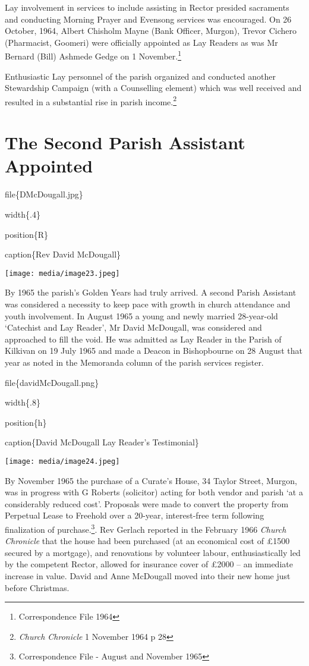 Lay involvement in services to include assisting in Rector presided
sacraments and conducting Morning Prayer and Evensong services was
encouraged. On 26 October, 1964, Albert Chisholm Mayne (Bank Officer,
Murgon), Trevor Cichero (Pharmacist, Goomeri) were officially appointed
as Lay Readers as was Mr Bernard (Bill) Ashmede Gedge on 1
November.\footnote{Correspondence File 1964}

Enthusiastic Lay personnel of the parish organized and conducted another
Stewardship Campaign (with a Counselling element) which was well
received and resulted in a substantial rise in parish income.\footnote{\emph{Church
  Chronicle} 1 November 1964 p 28}

\hypertarget{the-second-parish-assistant-appointed}{%
\section{The Second Parish Assistant
Appointed}\label{the-second-parish-assistant-appointed}}

file\{DMcDougall.jpg\}

width\{.4\}

position\{R\}

caption\{Rev David McDougall\}

\texttt{[image: media/image23.jpeg]}

By 1965 the parish's Golden Years had truly arrived. A second Parish
Assistant was considered a necessity to keep pace with growth in church
attendance and youth involvement. In August 1965 a young and newly
married 28-year-old `Catechist and Lay Reader', Mr David McDougall, was
considered and approached to fill the void. He was admitted as Lay
Reader in the Parish of Kilkivan on 19 July 1965 and made a Deacon in
Bishopbourne on 28 August that year as noted in the Memoranda column of
the parish services register.

file\{davidMcDougall.png\}

width\{.8\}

position\{h\}

caption\{David McDougall Lay Reader's Testimonial\}

\texttt{[image: media/image24.jpeg]}

By November 1965 the purchase of a Curate's House, 34 Taylor Street,
Murgon, was in progress with G Roberts (solicitor) acting for both
vendor and parish `at a considerably reduced cost'. Proposals were made
to convert the property from Perpetual Lease to Freehold over a 20-year,
interest-free term following finalization of purchase.\footnote{Correspondence
  File - August and November 1965}. Rev Gerlach reported in the February
1966 \emph{Church Chronicle} that the house had been purchased (at an
economical cost of £1500 secured by a mortgage), and renovations by
volunteer labour, enthusiastically led by the competent Rector, allowed
for insurance cover of £2000 -- an immediate increase in value. David
and Anne McDougall moved into their new home just before Christmas.

